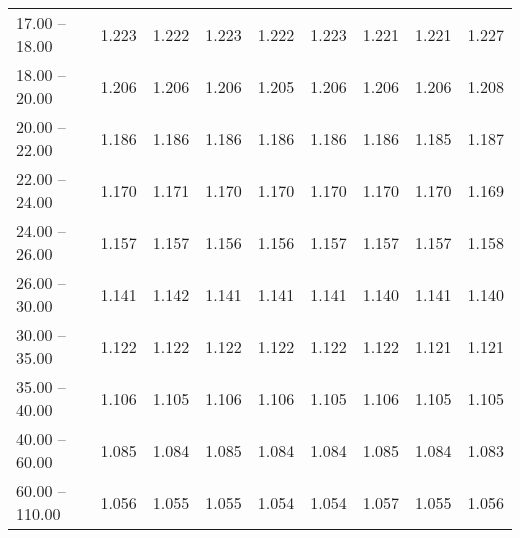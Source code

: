 \begin{table}[htp]
\begin{tiny}
\begin{center}
\begin{tabular}{|l|c|c|c|c|c|c|c|c|}
      17.00 -- 18.00 &  1.223 & 1.222 & 1.223 & 1.222 & 1.223 & 1.221 & 1.221 & 1.227 \\ 
      18.00 -- 20.00 &  1.206 & 1.206 & 1.206 & 1.205 & 1.206 & 1.206 & 1.206 & 1.208 \\ 
      20.00 -- 22.00 &  1.186 & 1.186 & 1.186 & 1.186 & 1.186 & 1.186 & 1.185 & 1.187 \\ 
      22.00 -- 24.00 &  1.170 & 1.171 & 1.170 & 1.170 & 1.170 & 1.170 & 1.170 & 1.169 \\ 
      24.00 -- 26.00 &  1.157 & 1.157 & 1.156 & 1.156 & 1.157 & 1.157 & 1.157 & 1.158 \\ 
      26.00 -- 30.00 &  1.141 & 1.142 & 1.141 & 1.141 & 1.141 & 1.140 & 1.141 & 1.140 \\ 
      30.00 -- 35.00 &  1.122 & 1.122 & 1.122 & 1.122 & 1.122 & 1.122 & 1.121 & 1.121 \\ 
      35.00 -- 40.00 &  1.106 & 1.105 & 1.106 & 1.106 & 1.105 & 1.106 & 1.105 & 1.105 \\ 
      40.00 -- 60.00 &  1.085 & 1.084 & 1.085 & 1.084 & 1.084 & 1.085 & 1.084 & 1.083 \\ 
      60.00 -- 110.00 &  1.056 & 1.055 & 1.055 & 1.054 & 1.054 & 1.057 & 1.055 & 1.056 \\ 
\hline
\end{tabular} 
             \end{center} 
             \end{tiny} 
             \label{tab:sa_trpp_psi2s8} 
             \end{table}


